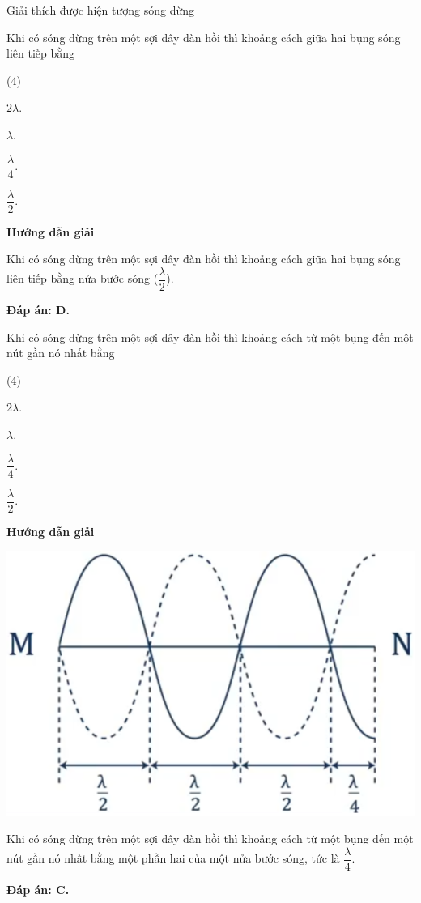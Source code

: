 \begin{dang}{Giải thích được hiện tượng sóng dừng}
	{Khi có sóng dừng trên một sợi dây đàn hồi thì khoảng cách giữa hai bụng sóng liên tiếp bằng
		\begin{mcq}(4)
			\item $2\lambda$.
			\item $\lambda$. 
			\item $\dfrac{\lambda}{4}$.
			\item $\dfrac{\lambda}{2}$.
		\end{mcq}
	}
	{
		\begin{center}
			\textbf{Hướng dẫn giải}
		\end{center}
		
		Khi có sóng dừng trên một sợi dây đàn hồi thì khoảng cách giữa hai bụng sóng liên tiếp bằng nửa bước sóng ($\dfrac{\lambda}{2}$).
		
		\textbf{Đáp án: D.}
	}
	{Khi có sóng dừng trên một sợi dây đàn hồi thì khoảng cách từ một bụng đến một nút gần nó nhất bằng
		
		\begin{mcq}(4)
			\item $2\lambda$.
			\item $\lambda$. 
			\item $\dfrac{\lambda}{4}$.
			\item $\dfrac{\lambda}{2}$.
		\end{mcq}
	}
	{\begin{center}
			\textbf{Hướng dẫn giải}
			
			\vspace*{1em}
			\includegraphics[scale=0.6]{../figs/VN12-PH-12-L-007-1-V2-5.png}
		\end{center}
		
		Khi có sóng dừng trên một sợi dây đàn hồi thì khoảng cách từ một bụng đến một nút gần nó nhất bằng một phần hai của một nửa bước sóng, tức là $\dfrac{\lambda}{4}$.
		
		\textbf{Đáp án: C.}
	}
\end{dang}